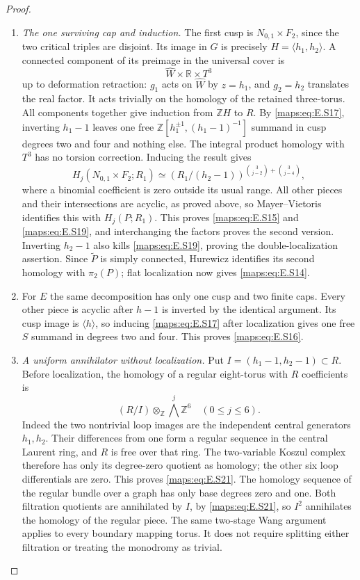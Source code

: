 \begin{proof}
\begin{enumerate}[label=\arabic*.,leftmargin=*]
\item \emph{The one surviving cap and induction.}
The first cusp is $N_{0,1}\times F_2$, since the two critical
triples are disjoint. Its image in $G$ is precisely
$H=\langle h_1,h_2\rangle$. A connected component of its
preimage in the universal cover is
\[
                \widehat W\times\mathbb R\times T^3
\]
up to deformation retraction: $g_1$ acts on $\widehat W$ by
$z=h_1$, and $g_2=h_2$ translates the real factor. It acts
trivially on the homology of the retained three-torus. All
components together give induction from $\mathbb ZH$ to
$R$. By \eqref{maps:eq:E.S17}, inverting $h_1-1$ leaves one free
$\mathbb Z[h_1^{\pm1},(h_1-1)^{-1}]$ summand in cusp degrees
two and four and nothing else. The integral product homology
with $T^3$ has no torsion correction. Inducing the result gives
\[
 H_j(N_{0,1}\times F_2;R_1)
   \simeq
 \left(R_1/(h_2-1)\right)^{
           \binom3{j-2}+\binom3{j-4}},
 \tag{E.S19}\label{maps:eq:E.S19}
\]
where a binomial coefficient is zero outside its usual range.
All other pieces and their intersections are acyclic, as
proved above, so Mayer--Vietoris identifies this with
$H_j(P;R_1)$. This proves \eqref{maps:eq:E.S15} and \eqref{maps:eq:E.S19}, and interchanging
the factors proves the second version. Inverting $h_2-1$
also kills \eqref{maps:eq:E.S19}, proving the double-localization assertion.
Since $\widetilde P$ is simply connected, Hurewicz identifies
its second homology with $\pi_2(P)$; flat localization now
gives \eqref{maps:eq:E.S14}.

\item For $E$ the same decomposition has only one cusp and two
finite caps. Every other piece is acyclic after $h-1$ is
inverted by the identical argument. Its cusp image is
$\langle h\rangle$, so inducing \eqref{maps:eq:E.S17} after localization
gives one free $S$ summand in degrees two and four. This
proves \eqref{maps:eq:E.S16}.

\item \emph{A uniform annihilator without localization.}
Put $I=(h_1-1,h_2-1)\subset R$. Before localization, the homology
of a regular eight-torus with $R$ coefficients is
\[
                 (R/I)\otimes_{\mathbb Z}\bigwedge^j\mathbb Z^6
                      \quad(0\leq j\leq6).
 \tag{E.S21}\label{maps:eq:E.S21}
\]
Indeed the two nontrivial loop images are the independent central
generators $h_1,h_2$. Their differences from one form a regular
sequence in the central Laurent ring, and $R$ is free over that
ring. The two-variable Koszul complex therefore has only its
degree-zero quotient as homology; the other six loop differentials
are zero. This proves \eqref{maps:eq:E.S21}.
The homology sequence of the regular bundle over a graph has
only base degrees zero and one. Both filtration quotients are
annihilated by $I$, by \eqref{maps:eq:E.S21}, so $I^2$ annihilates the homology
of the regular piece. The same two-stage Wang argument applies
to every boundary mapping torus. It does not require splitting
either filtration or treating the monodromy as trivial.


\end{enumerate}
\end{proof}
